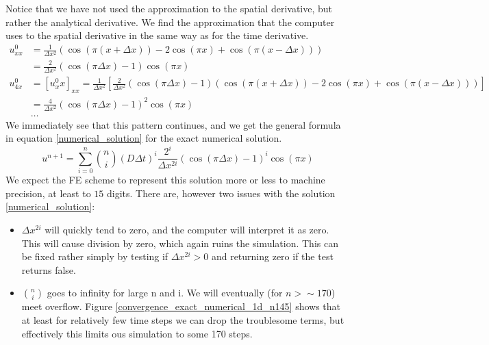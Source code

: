 Notice that we have not used the approximation to the spatial derivative, but rather the analytical derivative. 
We find the approximation that the computer uses to the spatial derivative in the same way as for the time derivative. 
\begin{align*}
 u^0_{xx} &= \frac{1}{\Delta x^2}\left(\cos(\pi(x+\Delta x)) -2\cos(\pi x) +\cos(\pi(x-\Delta x))\right) \\
 &= \frac{2}{\Delta x^2}\left(\cos(\pi\Delta x)-1\right)\cos(\pi x)\\
 u^0_{4x} &= [u^0_xx]_{xx} = \frac{1}{\Delta x^2}\left[\frac{2}{\Delta x^2}\left(\cos(\pi\Delta x)-1\right)\left(\cos(\pi(x+\Delta x)) -2\cos(\pi x) +\cos(\pi(x-\Delta x))\right)\right]\\
 &= \frac{4}{\Delta x^2}\left(\cos(\pi\Delta x)-1\right)^2\cos(\pi x)\\
 &\dots
\end{align*}
We immediately see that this pattern continues, and we get the general formula in equation \ref{numerical_solution} for the exact numerical solution.
\begin{equation}\label{numerical_solution}
  u^{n+1} = \sum\limits_{i=0}^n {n\choose i}\left(D\Delta t\right)^i\frac{2^i}{\Delta x^{2i}}\left(\cos(\pi\Delta x)-1\right)^i\cos(\pi x)
\end{equation}
We expect the FE scheme to represent this solution more or less to machine precision, at least to $15$ digits. 
There are, however two issues with the solution \ref{numerical_solution}:
\begin{itemize}
 \item $\Delta x^{2i}$ will quickly tend to zero, and the computer will interpret it as zero. This will cause division by zero, which again ruins the simulation. This can be fixed rather simply by testing if $\Delta x^{2i}>0$ and returning zero if the test returns false.
 \item ${n\choose i}$ goes to infinity for large n and i. We will eventually (for $n>\sim170$) meet overflow. Figure \ref{convergence_exact_numerical_1d_n145} shows that at least for relatively few time steps  we can drop the troublesome terms, but effectively this limits ous simulation to some 170 steps.
\end{itemize}

